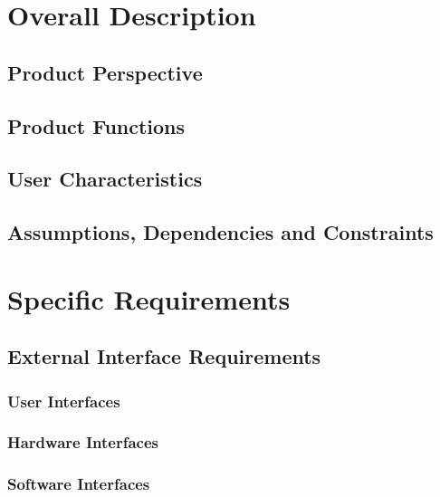 \documentclass[a4paper]{article}
\begin{document}
\newpage
\section{Overall Description}

    \subsection{Product Perspective}
    
    \subsection{Product Functions}
    
    \subsection{User Characteristics}
    
    \subsection{Assumptions, Dependencies and Constraints}
    
\newpage
\section{Specific Requirements}

    \subsection{External Interface Requirements}
        
        \subsubsection{User Interfaces}
        
        \subsubsection{Hardware Interfaces}
        
        \subsubsection{Software Interfaces}
        
\end{document}

